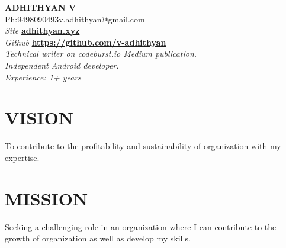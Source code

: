 \documentclass[11pt,a4paper]{article}
\begin{document}
\begin{center}
{\LARGE{\textbf{ADHITHYAN V}}}\\
{Ph:9498090493\hfill}{\hfill v.adhithyan@gmail.com} \\
\emph{Site} \textbf{\href{adhithyan.xyz}{adhithyan.xyz}} \\
\emph{Github} \textbf{\href{https://github.com/v-adhithyan}{https://github.com/v-adhithyan}}\\
\emph{Technical writer on codeburst.io Medium publication.}\\
\emph{Independent Android developer.}\\
\emph{Experience: 1+ years}
\noindent\makebox[\linewidth]{\rule{\paperwidth}{0.4pt}}
\end{center}
\begin{multicols}{2}
\section*{VISION}
\par To contribute to the profitability and sustainability of organization with my expertise.
\section*{MISSION}
\par Seeking a challenging role in an organization where I can contribute to the growth of organization as well as develop my skills.
\end{multicols}
\end{document}
